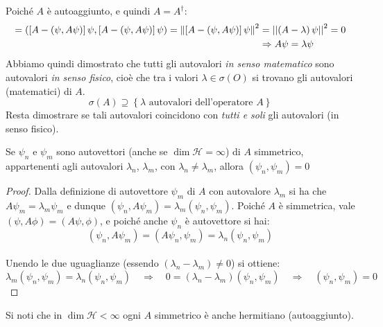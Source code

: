 Poiché $A$ è autoaggiunto, e quindi $A=A^\dag$:
\begin{align}
\nonumber =\left(\left[A-\left(\psi,A\psi\right)\right]\psi,\left[A-\left(\psi,A\psi\right)\right]\psi\right)=\left\lVert\left[A-\left(\psi,A\psi\right)\right]\psi\right\rVert^2&=\left|\left|\left(A-\lambda\right)\psi\right|\right|^2 = 0\\
\label{eqn:fluttuazione-autoaggiunto}
 &\Rightarrow A\psi=\lambda\psi
\end{align}
Abbiamo quindi dimostrato che tutti gli autovalori \textit{in senso matematico} sono autovalori \textit{in senso fisico}, cioè che tra i valori $\lambda \in \sigma \left(O\right)$ si trovano gli autovalori (matematici) di $A$.
\[
\sigma\left(A\right)\supseteq\left\{\lambda\text{ autovalori dell'operatore } A\right\}
\]
Resta dimostrare se tali autovalori  coincidono con \textit{tutti e soli} gli autovalori (in senso fisico).\\

\begin{thm}
Se $\psi_n$ e $\psi_m$ sono autovettori (anche se $\dim{\mathcal{H}=\infty}$) di $A$ simmetrico, appartenenti agli autovalori $\lambda_n$, $\lambda_m$, con $\lambda_n\neq \lambda_m$, allora $\left(\psi_n, \psi_m\right)=0$
\end{thm}
\begin{proof} Dalla definizione di autovettore $\psi_m$ di $A$ con autovalore $\lambda_m$ si ha che $A\psi_m = \lambda_m \psi_m$ e dunque $\left(\psi_n, A\psi_m\right)=\lambda_m\left(\psi_n, \psi_m\right)$.
Poiché $A$ è simmetrica, vale $(\psi, A \phi) = (A \psi, \phi)$, e poiché anche $\psi_n$ è autovettore si hai:
\[ (\psi_n, A\psi_m) = (A\psi_n, \psi_m) = \lambda_n (\psi_n, \psi_m)\]\\
Unendo le due uguaglianze (essendo $\left(\lambda_n-\lambda_m\right)\neq 0$) si ottiene:
\[
\lambda_m (\psi_n, \psi_m) = \lambda_n (\psi_n, \psi_m) \quad \Rightarrow \quad 0 = (\lambda_n -\lambda_m)(\psi_n, \psi_m) \quad \Rightarrow \quad (\psi_n, \psi_m) = 0
\]
\end{proof}
Si noti che in $\dim{\mathcal{H}<\infty}$ ogni $A$ simmetrico è anche hermitiano (autoaggiunto).\\ %

